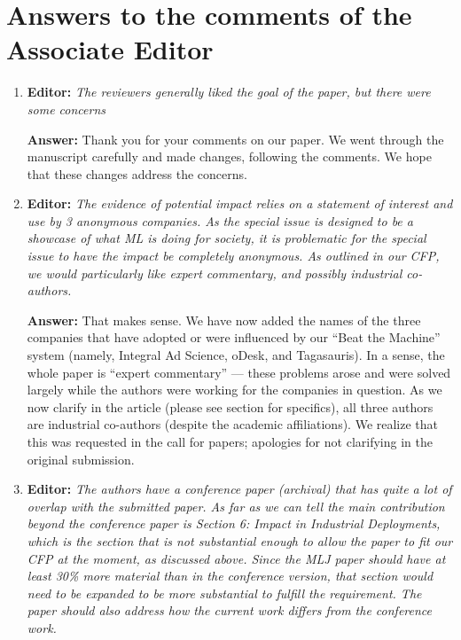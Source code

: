 \documentclass[letterpaper]{article}
\begin{document}
\section{Answers to the comments of the Associate Editor}



\begin{enumerate}

\item \textbf{Editor:} \emph{The reviewers generally liked the goal of the paper, but there were some concerns}

\textbf{Answer:} Thank you for your comments on our paper. We went through the manuscript carefully and made changes, following the comments. We hope that these changes address the concerns.

\item \textbf{Editor:}  \emph{The evidence of potential impact relies on a statement of interest and use by 3 anonymous companies. As the special issue is designed to be a showcase of what ML is doing for society, it is problematic for the special issue to have the impact be completely anonymous. As outlined in our CFP, we would particularly like expert commentary, and possibly industrial co-authors.}

\textbf{Answer:}  That makes sense.  We have now added the names of the three companies that have adopted or were influenced by our ``Beat the Machine'' system (namely, Integral Ad Science, oDesk, and Tagasauris).  In a sense, the whole paper is ``expert commentary'' --- these problems arose and were solved largely while the authors were working for the companies in question.  As we now clarify in the article (please see section for specifics), all three authors are industrial co-authors (despite the academic affiliations).  We realize that this was requested in the call for papers; apologies for not clarifying in the original submission.

\item \textbf{Editor:}  \emph{The authors have a conference paper (archival) that has quite a lot of overlap with the submitted paper. As far as we can tell the main contribution beyond the conference paper is Section 6: Impact in Industrial Deployments, which is the section that is not substantial enough to allow the paper to fit our CFP at the moment, as discussed above. Since the MLJ paper should have at least 30\% more material than in the conference version, that section would need to be expanded to be more substantial to fulfill the requirement. The paper should also address how the current work differs from the conference work. }


\end{enumerate}
\end{document}
